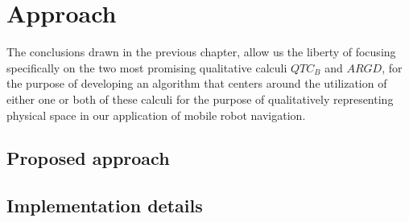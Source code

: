 
\chapter{Approach}
The conclusions drawn in the previous chapter, allow us the liberty of focusing specifically on the two most promising qualitative calculi $QTC_B$ and $ARGD$, for the purpose of developing an algorithm that centers around the utilization of either one or both of these calculi for the purpose of qualitatively representing physical space in our application of mobile robot navigation.

\section{Proposed approach}


\section{Implementation details}
